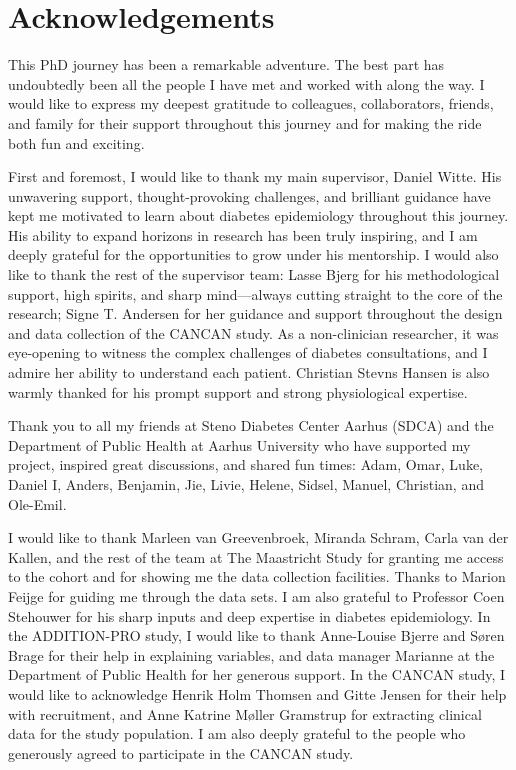 \documentclass[
  letterpaper,
  headsepline=true,
  open=any]{scrbook}
\begin{document}

\hypertarget{acknowledgements}{%
\chapter*{Acknowledgements}\label{acknowledgements}}


This PhD journey has been a remarkable adventure. The best part has
undoubtedly been all the people I have met and worked with along the
way. I would like to express my deepest gratitude to colleagues,
collaborators, friends, and family for their support throughout this
journey and for making the ride both fun and exciting.

First and foremost, I would like to thank my main supervisor, Daniel
Witte. His unwavering support, thought-provoking challenges, and
brilliant guidance have kept me motivated to learn about diabetes
epidemiology throughout this journey. His ability to expand horizons in
research has been truly inspiring, and I am deeply grateful for the
opportunities to grow under his mentorship. I would also like to thank
the rest of the supervisor team: Lasse Bjerg for his methodological
support, high spirits, and sharp mind---always cutting straight to the
core of the research; Signe T. Andersen for her guidance and support
throughout the design and data collection of the CANCAN study. As a
non-clinician researcher, it was eye-opening to witness the complex
challenges of diabetes consultations, and I admire her ability to
understand each patient. Christian Stevns Hansen is also warmly thanked
for his prompt support and strong physiological expertise.

Thank you to all my friends at Steno Diabetes Center Aarhus (SDCA) and
the Department of Public Health at Aarhus University who have supported
my project, inspired great discussions, and shared fun times: Adam,
Omar, Luke, Daniel I, Anders, Benjamin, Jie, Livie, Helene, Sidsel,
Manuel, Christian, and Ole-Emil.

I would like to thank Marleen van Greevenbroek, Miranda Schram, Carla
van der Kallen, and the rest of the team at The Maastricht Study for
granting me access to the cohort and for showing me the data collection
facilities. Thanks to Marion Feijge for guiding me through the data
sets. I am also grateful to Professor Coen Stehouwer for his sharp
inputs and deep expertise in diabetes epidemiology. In the ADDITION-PRO
study, I would like to thank Anne-Louise Bjerre and Søren Brage for
their help in explaining variables, and data manager Marianne at the
Department of Public Health for her generous support. In the CANCAN
study, I would like to acknowledge Henrik Holm Thomsen and Gitte Jensen
for their help with recruitment, and Anne Katrine Møller Gramstrup for
extracting clinical data for the study population. I am also deeply
grateful to the people who generously agreed to participate in the
CANCAN study.
\end{document}

